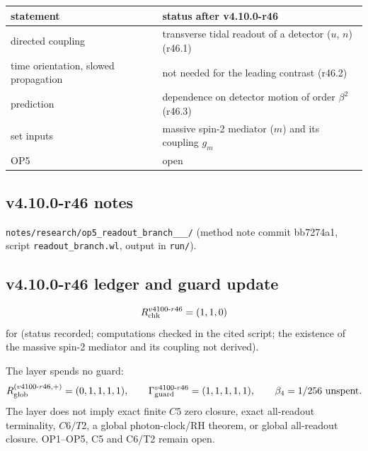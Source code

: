 \begin{center}
\small
\begin{tabular}{@{}>{\raggedright\arraybackslash}p{}>{\raggedright\arraybackslash}p{}@{}}
\toprule
statement & status after v4.10.0-r46\\
\midrule
directed coupling & transverse tidal readout of a detector (\(u\), \(n\)) (r46.1)\\
time orientation, slowed propagation & not needed for the leading contrast (r46.2)\\
prediction & dependence on detector motion of order \(\beta^2\) (r46.3)\\
set inputs & massive spin-2 mediator (\(m\)) and its coupling \(g_m\)\\
OP5 & open\\
\bottomrule
\end{tabular}
\end{center}

\subsection*{v4.10.0-r46 notes}
\label{subsec:v4100-r46-notes}

\texttt{notes/\allowbreak research/\allowbreak op5\_\allowbreak readout\_\allowbreak branch\_\_\_/} (method note commit bb7274a1,
script \texttt{readout\_\allowbreak branch.wl}, output in \texttt{run/}).

\subsection*{v4.10.0-r46 ledger and guard update}
\label{subsec:v4100-r46-ledger-guard}

\[
R_{\rm chk}^{v4100\text{-}r46}=(1,1,0)
\]
for (status recorded; computations checked in the cited script; the existence of the massive spin-2 mediator and its coupling not derived).

The layer spends no guard:
\[
R_{\rm glob}^{(v4100\text{-}r46,+)}=(0,1,1,1,1),
\qquad
\Gamma_{\rm guard}^{v4100\text{-}r46}=(1,1,1,1,1),
\qquad
\beta_4=1/256\ \text{unspent}.
\]
The layer does not imply exact finite \(C5\) zero closure, exact all-readout terminality, \(C6/T2\), a global photon-clock/RH theorem,
or global all-readout closure.  OP1--OP5, C5 and C6/T2 remain open.
